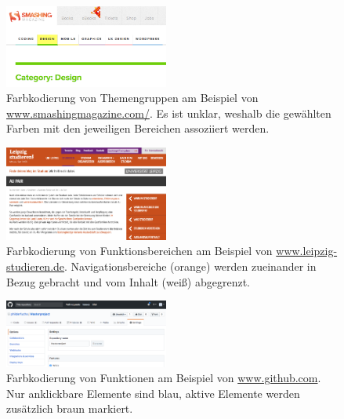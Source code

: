 \documentclass[11pt,a4paper,bibliography=totoc,twocolumn]{scrartcl}
\begin{document}
\begin{figure}[h]
	\centering
	\includegraphics[width=0.48\textwidth]{img/theme_coding.png}
	\caption{Farbkodierung von Themengruppen am Beispiel von \url{www.smashingmagazine.com/}. Es ist unklar, weshalb die gewählten Farben mit den jeweiligen Bereichen assoziiert werden.}
	\label{fig:theme_coding}
\end{figure}

\begin{figure}[h]
	\centering
	\includegraphics[width=0.48\textwidth]{img/functional_areas.png}
	\caption{Farbkodierung von Funktionsbereichen am Beispiel von \url{www.leipzig-studieren.de}. Navigationsbereiche (orange) werden zueinander in Bezug gebracht und vom Inhalt (weiß) abgegrenzt.}
	\label{fig:functional_areas}
\end{figure}

\begin{figure}[h]
	\centering
	\includegraphics[width=0.48\textwidth]{img/functions.png}
	\caption{Farbkodierung von Funktionen am Beispiel von \url{www.github.com}. Nur anklickbare Elemente sind blau, aktive Elemente werden zusätzlich braun markiert.}
	\label{fig:functions}
\end{figure}
\end{document}
